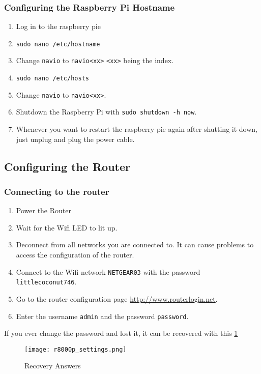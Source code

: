 \subsubsection{Configuring the Raspberry Pi Hostname}
\begin{enumerate}
    \item Log in to the raspberry pie
    \item \texttt{sudo nano /etc/hostname}
    \item Change \texttt{navio} to \texttt{navio<xx>} \texttt{<xx>} being the index.
    \item \texttt{sudo nano /etc/hosts}
    \item Change \texttt{navio} to \texttt{navio<xx>}.
    \item Shutdown the Raspberry Pi with \texttt{sudo shutdown -h now}.
    \item Whenever you want to restart the raspberry pie again after shutting it down, just unplug and plug the power cable.
\end{enumerate}

\subsection{Configuring the Router}
\subsubsection{Connecting to the router}
\begin{enumerate}
    \item Power the Router
    \item Wait for the Wifi LED to lit up.
    \item Deconnect from all networks you are connected to. It can cause problems to access the configuration of the router.
    \item Connect to the Wifi network \texttt{NETGEAR03} with the password \texttt{littlecoconut746}.
    \item Go to the router configuration page \url{http://www.routerlogin.net}.
    \item Enter the username \texttt{admin} and the password \texttt{password}.
\end{enumerate}

If you ever change the password and lost it, it can be recovered with this \ref{fig:r8000p_settings}

\begin{figure}[!ht]
    \centering
    \texttt{[image: r8000p\_settings.png]}
    \caption{Recovery Answers}
    \label{fig:r8000p_settings}
\end{figure}



